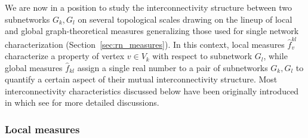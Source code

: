 \documentclass[graybox]{svmult}
\begin{document}

We are now in a position to study the interconnectivity structure between two subnetworks $G_k, G_l$ on several topological scales drawing on the lineup of local and global graph-theoretical measures generalizing those used for single network characterization (Section~\ref{sec:rn_measures}). In this context, local measures $\hat{f}_v^{kl}$ characterize a property of vertex $v \in V_k$ with respect to subnetwork $G_l$, while global measures $\hat{f}_{kl}$ assign a single real number to a pair of subnetworks $G_k, G_l$ to quantify a certain aspect of their mutual interconnectivity structure. Most interconnectivity characteristics discussed below have been originally introduced in \cite{Donges2011EPJB} which see for more detailed discussions.


\subsubsection{Local measures}
\end{document}
